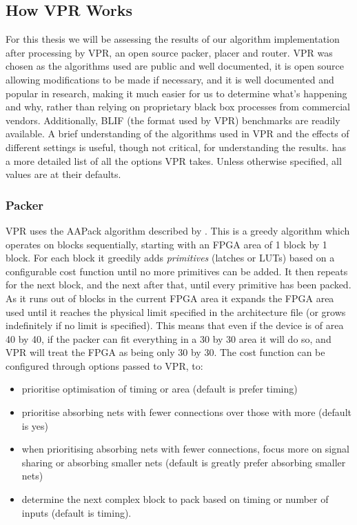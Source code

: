 \documentclass[12pt,final,oneside]{dwThesis} %
\begin{document}
   \subsection{How \gls{VPR} Works}
   \label{VPRSection} For this thesis we will be assessing the results
   of our algorithm implementation after processing by \gls{VPR}, an open
   source packer, placer and router. \gls{VPR} was chosen as the algorithms
   used are public and well documented, it is open source allowing
   modifications to be made if necessary, and it is well documented and popular
   in research, making it much easier for us to determine what's happening and
   why, rather than relying on proprietary black box processes from commercial
   vendors. Additionally, \gls{BLIF} (the format used by \gls{VPR}) benchmarks
   are readily available.  A brief understanding of the algorithms used in
   \gls{VPR} and the effects of different settings is useful, though not
   critical, for understanding the results. \cite{VPRManual} has a more
   detailed list of all the options \gls{VPR} takes. Unless otherwise
   specified, all values are at their defaults.  \subsubsection{Packer}
   \gls{VPR} uses the AAPack algorithm described by \cite{AAPackThesis}. This
   is a greedy algorithm which operates on blocks sequentially, starting with
   an \gls{FPGA} area of 1 block by 1 block. For each block it greedily adds
   \textit{primitives} (latches or \glspl{LUT}) based on a configurable cost
   function until no more primitives can be added. It then repeats for the next
   block, and the next after that, until every primitive has been packed. As it
   runs out of blocks in the current \gls{FPGA} area it expands the \gls{FPGA}
   area used until it reaches the physical limit specified in the architecture
   file (or grows indefinitely if no limit is specified). This means that even
   if the device is of area 40 by 40, if the packer can fit everything in a 30
   by 30 area it will do so, and \gls{VPR} will treat the \gls{FPGA} as being
   only 30 by 30.  The cost function can be configured through options passed
   to \gls{VPR}, to\cite{VPRManual}: 
   \begin{itemize}

      \item prioritise optimisation of timing or area (default is prefer
         timing)
      \item prioritise absorbing nets with fewer connections over those with
         more (default is yes)
      \item when prioritising absorbing nets with fewer connections, focus more
         on signal sharing or absorbing smaller nets (default is greatly
         prefer absorbing smaller nets)
      \item determine the next complex block to pack based on timing or number
         of inputs (default is timing).  
   \end{itemize}
\end{document}
